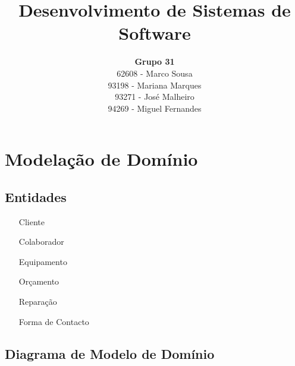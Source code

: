 \documentclass[a4paper, 12pt]{article}
\title {Desenvolvimento de Sistemas de Software}
\author{\textbf{Grupo 31} \\
        62608 - Marco Sousa \\
        93198 - Mariana Marques \\
        93271 - José Malheiro \\
        94269 - Miguel Fernandes}
\begin{document}
\maketitle

\section{Modelação de Domínio}
\subsection{Entidades}

\begin{itemize}
        \item[Cliente]{} %
        \item[Colaborador] {} %
        \item[Equipamento] {} %
        \item[Orçamento] {}
        \item[Reparação] {} %
        \item[Forma de Contacto] {}
\end{itemize}






\subsection{Diagrama de Modelo de Domínio} %
\end{document}
